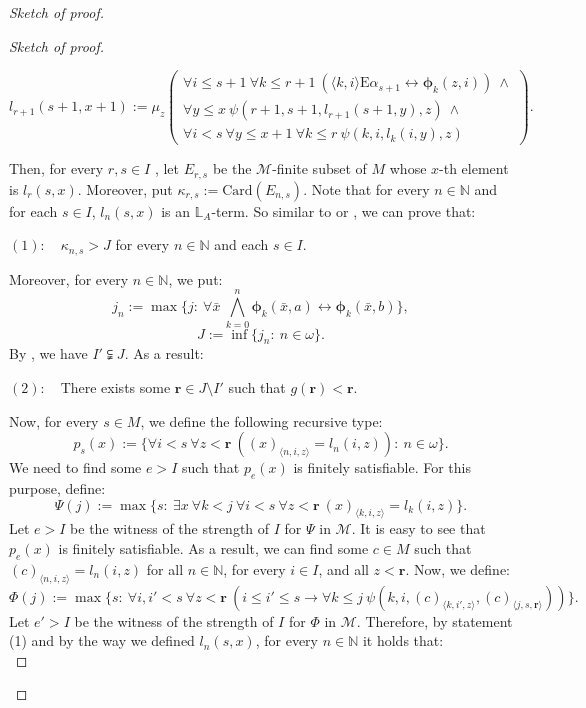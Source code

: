 \documentclass[11pt]{article}
\theoremstyle{plain}
\theoremstyle{definition}
\newcommand{\M}{\mathcal{M}}
\newcommand{\NN}{\mathbb{N}}
\newcommand{\E}{\mathrm{E}}
\begin{document}
\begin{proof}[Sketch of proof]
\begin{proof}[Sketch of proof]
\begin{center}
$l_{r+1}(s+1,x+1):=\mu_{z} \left(\begin{array}{c}
	\forall i\leq s+1 \ \forall k\leq r+1 \ (
	\langle k,i\rangle\E\alpha_{s+1}\leftrightarrow \bm{\phi}_{k}(z,i)) \ \wedge \\
	\forall y\leq x \ \psi(r+1,s+1,l_{r+1}(s+1,y),z) \ \wedge \\
	\forall i<s \ \forall y\leq x+1 \ \forall k\leq r \ \psi(k,i,l_{k}(i,y),z) 
\end{array}\right).$
\end{center}
Then, for every  $r,s\in I$  , let $E_{r,s}$ be the $\M$-finite subset of $M$ whose $x$-th element is $l_{r}(s,x)$. Moreover, put $\kappa_{r,s}:=\mathrm{Card}(E_{n,s})$. Note that for every $n\in\NN$ and for  each $s\in I$, $l_{n}(s,x)$  is an $\mathbb{L}_{A}$-term. So similar to \cite{sho2} or \cite{k}, we can prove that:
\begin{center}
$(1): \ \ \ $ $\kappa_{n,s}>J$ for every $n\in \NN$ and each $s\in I$.
\end{center} 

Moreover, for every $n\in\NN$, we put:
$$j_{n}:=\max\{j:\ \forall \bar{x} \ \bigwedge_{k=0}^{n} \bm{\phi}_{k}(\bar{x},a)\leftrightarrow\bm{\phi}_{k}(\bar{x},b)\}, $$
$$J:=\inf\{j_{n}: \ n\in\omega\}. $$
By \cite[Lemma 2.7]{k}, we have $I'\subsetneqq J$. As a result:
\begin{center}
$(2): \ \ \ $ There exists some $\textbf{r}\in J\setminus I'$ such that $g(\textbf{r})<\textbf{r}$.
\end{center}  

Now, for every $s\in M$, we define the following recursive type:
$$p_{s}(x):=\{\forall i<s \ \forall z<\textbf{r} \ ((x)_{\langle n,i,z\rangle}=l_{n}(i,z)): \ n\in\omega\}. $$
We need to find some $e>I$ such that $p_{e}(x)$ is finitely satisfiable. For this purpose, define:
$$\Psi(j):=\max\{s: \ \exists x \ \forall k<j \ \forall i<s \ \forall z<\textbf{r} \ (x)_{\langle k,i,z\rangle}=l_{k}(i,z)\}. $$
Let $e>I$ be the witness of the strength of $I$ for  $\Psi$ in $\M$. It is easy to see that $p_{e}(x)$ is finitely satisfiable. As a result,   we can find some $c\in M$ such that $(c)_{\langle n,i,z\rangle}=l_{n}(i,z)$ for all $n\in\NN$, for every $i\in I$, and all $z< \textbf{r}$. 
Now, we define:
$$\Phi(j):=\max\{s: \ \forall i,i'<s \ \forall z<\textbf{r} \ (i\leq i'\leq s\rightarrow \forall k\leq j \ \psi(k,i,(c)_{\langle k,i',z\rangle},(c)_{\langle j,s,\textbf{r}\rangle}))\} .$$
Let $e'>I$ be the witness of the strength of $I$ for $\Phi $ in $\M$. Therefore, by  statement (1)  and by the way we defined $l_{n}(s,x)$, for every $n\in\NN$ it holds that:\\


\end{proof}
\end{proof}
\end{document}
